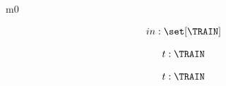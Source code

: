 \documentclass[12pt]{amsart}
\title{}
\author{}
\date{} %
\begin{document}
\maketitle
\tableofcontents


\begin{machine}{m0}

\newset{\TRAIN}

%
	\begin{align*}
\variable{		in : \set[\TRAIN]}
	\end{align*}
%




\begin{align*}
\dummy{	t : \TRAIN}
\end{align*}


\begin{align*}
\indices{leave}{	t: \TRAIN}
\end{align*}


\end{machine}
\end{document}

